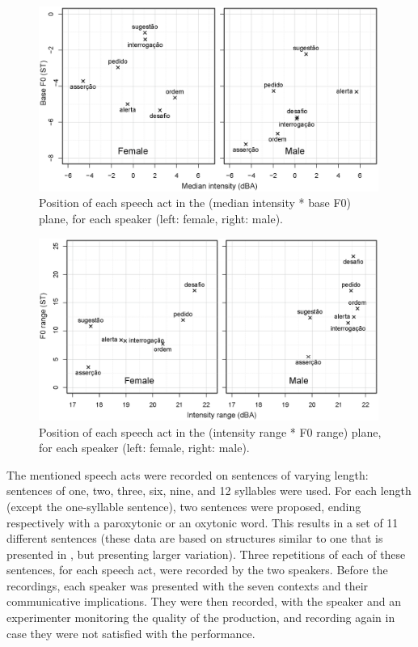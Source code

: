 \documentclass[output=paper]{LSP/langsci}
\begin{document}
\begin{figure}

\includegraphics[width=0.99\textwidth]{figures/MOR1.eps}
\caption{Position of each speech act in the (median intensity * base F0) plane, for each speaker (left: female, right: male). }
\label{figure:f0intbase}
\end{figure}

\begin{figure}

\includegraphics[width=0.99\textwidth]{figures/MOR2.eps}
\caption{Position of each speech act in the (intensity range * F0 range) plane, for each speaker (left: female, right: male).}
\label{figure:f0intrange}
\end{figure}


The mentioned speech acts were recorded on sentences of varying length: sentences of one, two, three, six, nine, and 12 syllables were used. 
For each length (except the one-syllable sentence), two sentences were proposed, ending respectively with a paroxytonic or an oxytonic word. 
This results in a set of 11 different sentences (these data are based on structures similar to one that is presented in \citealt{moraes2008pitch}, but presenting larger variation). 
Three repetitions of each of these sentences, for each speech act, were recorded by the two speakers.
Before the recordings, each speaker was presented with the seven contexts and their communicative implications. 
They were then recorded, with the speaker and an experimenter monitoring the quality of the production, and recording again in case they were not satisfied with the performance.
\end{document}
